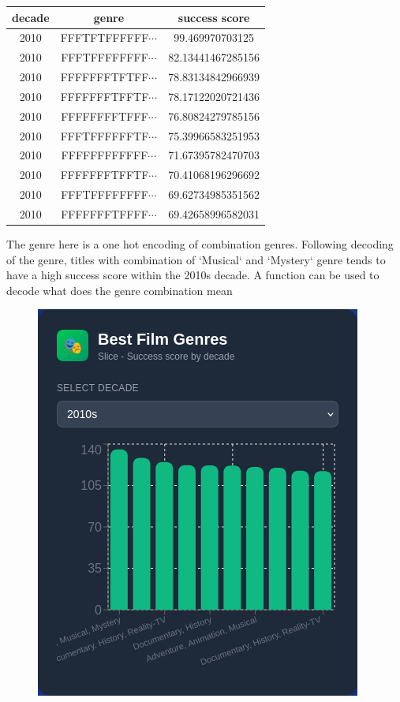 \begin{center}
	\begin{tabular}{|c|c|c|}
\hline
decade & genre & success score\\
\hline
2010 & FFFTFTFFFFFF$\cdots$ & 99.469970703125\\
2010 & FFFTFFFFFFFF$\cdots$ & 82.13441467285156\\
2010 & FFFFFFFTFTFF$\cdots$ & 78.83134842966939\\
2010 & FFFFFFFTFFTF$\cdots$ & 78.17122020721436\\
2010 & FFFFFFFFTFFF$\cdots$ & 76.80824279785156\\
2010 & FFFTFFFFFFTF$\cdots$ & 75.39966583251953\\
2010 & FFFFFFFFFFFF$\cdots$ & 71.67395782470703\\
2010 & FFFFFFFTFFTF$\cdots$ & 70.41068196296692\\
2010 & FFFTFFFFFFFF$\cdots$ & 69.62734985351562\\
2010 & FFFFFFFTFFFF$\cdots$ & 69.42658996582031\\
\hline
\end{tabular}
\end{center}

The genre here is a one hot encoding of combination genres. Following decoding of the genre, titles with combination of `Musical` and `Mystery` genre tends to have a high success score within the 2010s decade. A function can be used to decode what does the genre combination mean 

\begin{figure}[h!]
	\centering
	\includegraphics[width=0.7\linewidth]{images/image1.png}
	\caption{}
\end{figure}


